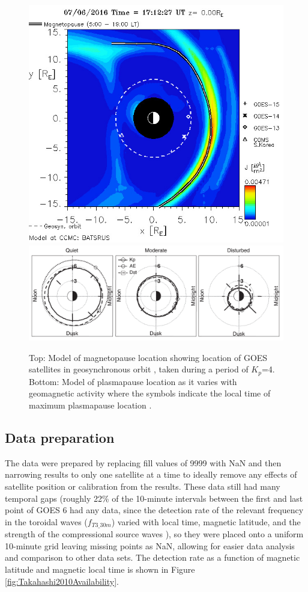 \begin{figure}[htp!]
	\centering
	\includegraphics[width=0.9\linewidth]{Figures/iSWACygnetStreamer.jpg}
	\includegraphics[width=0.9\linewidth]{Figures/PlasmapauseLocation.png}
	\caption{Top: Model of magnetopause location showing location of GOES satellites in geosynchronous orbit \citep{CCMC}, taken during a period of $K_p$=4. Bottom: Model of plasmapause location as it varies with geomagnetic activity where the symbols indicate the local time of maximum plasmapause location \citep{OBrien2003EmpiricalPlasmapause}.}
	\label{fig:PlasmapauseLocation}
\end{figure}

\subsection{Data preparation}
The data were prepared by replacing fill values of 9999 with NaN and then narrowing results to only one satellite at a time to ideally remove any effects of satellite position or calibration from the results. These data still had many temporal gaps (roughly 22\% of the 10-minute intervals between the first and last point of GOES 6 had any data, since the detection rate of the relevant frequency in the toroidal waves ($f_{T3\_30m}$) varied with local time, magnetic latitude, and the strength of the compressional source waves \citep{Takahashi2010SolarCycleVariation}), so they were placed onto a uniform 10-minute grid leaving missing points as NaN, allowing for easier data analysis and comparison to other data sets. The detection rate as a function of magnetic latitude and magnetic local time is shown in Figure \ref{fig:Takahashi2010Availability}.

